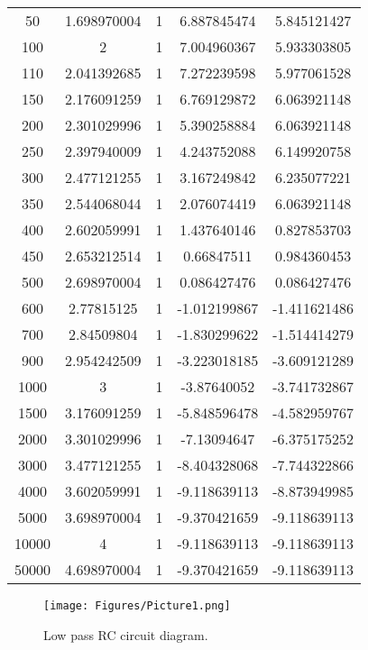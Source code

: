 \documentclass[a4paper, 12pt]{extarticle}
\begin{document}
\begin{table}[htbp]
\begin{tabular}{ccccc}
    50    & 1.698970004 & 1     & 6.887845474 & 5.845121427 \\
    100   & 2     & 1     & 7.004960367 & 5.933303805 \\
    110   & 2.041392685 & 1     & 7.272239598 & 5.977061528 \\
    150   & 2.176091259 & 1     & 6.769129872 & 6.063921148 \\
    200   & 2.301029996 & 1     & 5.390258884 & 6.063921148 \\
    250   & 2.397940009 & 1     & 4.243752088 & 6.149920758 \\
    300   & 2.477121255 & 1     & 3.167249842 & 6.235077221 \\
    350   & 2.544068044 & 1     & 2.076074419 & 6.063921148 \\
    400   & 2.602059991 & 1     & 1.437640146 & 0.827853703 \\
    450   & 2.653212514 & 1     & 0.66847511 & 0.984360453 \\
    500   & 2.698970004 & 1     & 0.086427476 & 0.086427476 \\
    600   & 2.77815125 & 1     & -1.012199867 & -1.411621486 \\
    700   & 2.84509804 & 1     & -1.830299622 & -1.514414279 \\
    900   & 2.954242509 & 1     & -3.223018185 & -3.609121289 \\
    1000  & 3     & 1     & -3.87640052 & -3.741732867 \\
    1500  & 3.176091259 & 1     & -5.848596478 & -4.582959767 \\
    2000  & 3.301029996 & 1     & -7.13094647 & -6.375175252 \\
    3000  & 3.477121255 & 1     & -8.404328068 & -7.744322866 \\
    4000  & 3.602059991 & 1     & -9.118639113 & -8.873949985 \\
    5000  & 3.698970004 & 1     & -9.370421659 & -9.118639113 \\
    10000 & 4     & 1     & -9.118639113 & -9.118639113 \\
    50000 & 4.698970004 & 1     & -9.370421659 & -9.118639113 \\
    \end{tabular}%
  \label{tab:addlabel}%
\end{table}%


\begin{figure}[htbp]
    \centering
    \texttt{[image: Figures/Picture1.png]}
    \caption{Low pass RC circuit diagram.}
    \label{fig:Low_Pass_RC_Circuit}
\end{figure}
\end{document}
